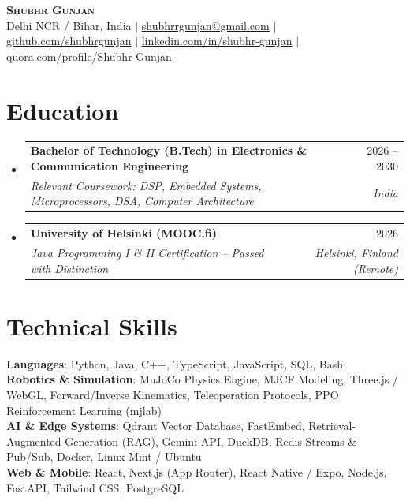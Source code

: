 \documentclass[letterpaper,10pt]{article}
\makeatletter
\newcommand{\resumeSubheading}[4]{
  \vspace{-2pt}\item
    \begin{tabular*}{0.97\textwidth}[t]{l@{\extracolsep{\fill}}r}
      \textbf{#1} & #2 \\
      \textit{\small#3} & \textit{\small #4} \\
    \end{tabular*}\vspace{-5pt}
}
\newcommand{\resumeSubHeadingListStart}{\begin{itemize}[leftmargin=0.15in, label={}]}
\newcommand{\resumeSubHeadingListEnd}{\end{itemize}}
\makeatother
\begin{document}
\begin{center}
    \textbf{\Huge \scshape Shubhr Gunjan} \\ \vspace{2pt}
    \small Delhi NCR / Bihar, India $|$ 
    \href{mailto:shubhrrgunjan@gmail.com}{\underline{shubhrrgunjan@gmail.com}} $|$ 
    \href{https://github.com/shubhrgunjan}{\underline{github.com/shubhrgunjan}} $|$ 
    \href{https://linkedin.com/in/shubhr-gunjan-6748802b0}{\underline{linkedin.com/in/shubhr-gunjan}} $|$ 
    \href{https://quora.com/profile/Shubhr-Gunjan}{\underline{quora.com/profile/Shubhr-Gunjan}}
\end{center}


\section{Education}
  \resumeSubHeadingListStart
    \resumeSubheading
      {Bachelor of Technology (B.Tech) in Electronics \& Communication Engineering}{2026 -- 2030}
      {Relevant Coursework: DSP, Embedded Systems, Microprocessors, DSA, Computer Architecture}{India}
    \resumeSubheading
      {University of Helsinki (MOOC.fi)}{2026}
      {Java Programming I \& II Certification -- Passed with Distinction}{Helsinki, Finland (Remote)}
  \resumeSubHeadingListEnd


\section{Technical Skills}
 \begin{itemize}[leftmargin=0.15in, label={}]
    \small{\item{
     \textbf{Languages}{: Python, Java, C++, TypeScript, JavaScript, SQL, Bash} \\
     \textbf{Robotics \& Simulation}{: MuJoCo Physics Engine, MJCF Modeling, Three.js / WebGL, Forward/Inverse Kinematics, Teleoperation Protocols, PPO Reinforcement Learning (mjlab)} \\
     \textbf{AI \& Edge Systems}{: Qdrant Vector Database, FastEmbed, Retrieval-Augmented Generation (RAG), Gemini API, DuckDB, Redis Streams \& Pub/Sub, Docker, Linux Mint / Ubuntu} \\
     \textbf{Web \& Mobile}{: React, Next.js (App Router), React Native / Expo, Node.js, FastAPI, Tailwind CSS, PostgreSQL}
    }}
 \end{itemize}
\end{document}
